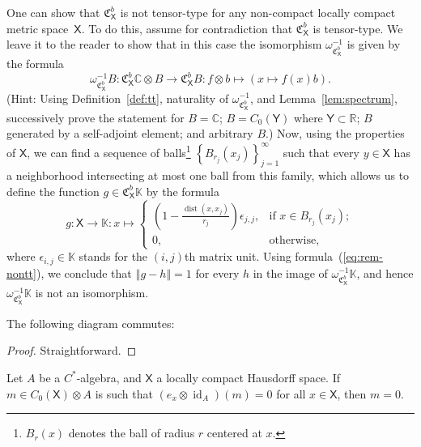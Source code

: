 \documentclass[10pt]{simplearticle}
\newcommand{\tikzinput}[1]{}
\newcommand{\norm}[1]{\left\Vert #1\right\Vert }
\newcommand{\dist}{\operatorname{dist}}
\newcommand{\id}{\operatorname{id}}
\newcommand{\oK}{\mathbb{K}}
\begin{document}
\begin{rem}
One
can show that $\mathfrak{C}^{b}_{\mathsf{X}}$
is not tensor-type for any non-compact locally compact metric space~$\mathsf{X}$.
To do this, assume for contradiction that $\mathfrak{C}^{b}_{\mathsf{X}}$
is tensor-type. We leave it to the reader to show that in this case
the isomorphism $\omega^{-1}_{\mathfrak{C}^{b}_{\mathsf{X}}}$ is
given by the formula
\begin{equation}
\omega^{-1}_{\mathfrak{C}^{b}_{\mathsf{X}}}B\colon\mathfrak{C}^{b}_{\mathsf{X}}\mathbb{C}\otimes B\to\mathfrak{C}^{b}_{\mathsf{X}}B\colon f\otimes b\mapsto(x\mapsto f(x)b).\label{eq:rem-nontt}
\end{equation}
(Hint: Using Definition~\ref{def:tt}, naturality of $\omega^{-1}_{\mathfrak{C}^{b}_{\mathsf{X}}}$,
and Lemma~\ref{lem:spectrum}, successively prove the statement for
$B=\mathbb{C}$; $B=C_{0}(\mathsf{Y})$ where $\mathsf{Y}\subset\mathbb{R}$;
$B$ generated by a self-adjoint element; and arbitrary $B$.) Now,
using the properties of $\mathsf{X}$, we can find a sequence of balls\footnote{$B_{r}(x)$ denotes the ball of radius $r$ centered at $x$.}
$\left\{ B_{r_{j}}(x_{j})\right\} ^{\infty}_{j=1}$ such that every
$y\in\mathsf{X}$ has a neighborhood intersecting at most one ball
from this family, which allows us to define the function $g\in\mathfrak{C}^{b}_{\mathsf{X}}\oK$
by the formula
\[
g\colon\mathsf{X}\to\oK\colon x\mapsto\begin{cases}
\left(1-\frac{\dist(x,x_{j})}{r_{j}}\right)\epsilon_{j,j}, & \textrm{if }x\in B_{r_{j}}(x_{j});\\
0, & \textrm{otherwise},
\end{cases}
\]
where $\epsilon_{i,j}\in\oK$ stands for the $(i,j)$th matrix unit.
Using formula~(\ref{eq:rem-nontt}), we conclude that $\norm{g-h}=1$
for every $h$ in the image of $\omega^{-1}_{\mathfrak{C}^{b}_{\mathsf{X}}}\oK$,
and hence $\omega^{-1}_{\mathfrak{C}^{b}_{\mathsf{X}}}\oK$ is not
an isomorphism.
\end{rem}

\begin{lem}\label{lem:26}
The following diagram commutes:
\[
\tikzinput{d438}
\]
\end{lem}

\begin{proof}
Straightforward.
\end{proof}

\begin{cor}\label{cor:teval}
Let $A$ be a $C^{*}$-algebra, and $\mathsf{X}$
a locally compact Hausdorff space. If $m\in C_{0}(\mathsf{X})\otimes A$
is such that $(e_{x}\otimes\id_{A})(m)=0$ for all $x\in\mathsf{X}$,
then $m=0$.
\end{cor}
\end{document}
